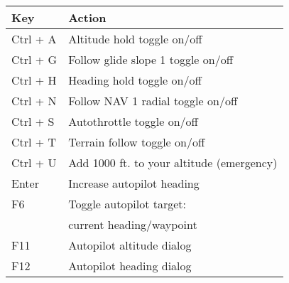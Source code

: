 \begin{tabular}{|l|l|}\hline
 Key              &         Action\\\hline
    Ctrl + A      &         Altitude hold\index{altitude hold} toggle on/off\\
    Ctrl + G      &         Follow glide slope 1 toggle on/off\\
    Ctrl + H      &         Heading hold\index{heading hold} toggle on/off\\
    Ctrl + N      &         Follow NAV 1 radial toggle on/off\\
    Ctrl + S      &         Autothrottle\index{autothrottle} toggle on/off\\
    Ctrl + T      &         Terrain follow toggle on/off\\
    Ctrl + U      &         Add 1000 ft. to your altitude (emergency)\\
    Enter		      &         Increase autopilot heading\\
    F6 		    		&         Toggle autopilot target:\\
                  &         current heading/waypoint\\
    F11           &         Autopilot altitude dialog\\
    F12           &         Autopilot heading dialog\\\hline
\end{tabular}

